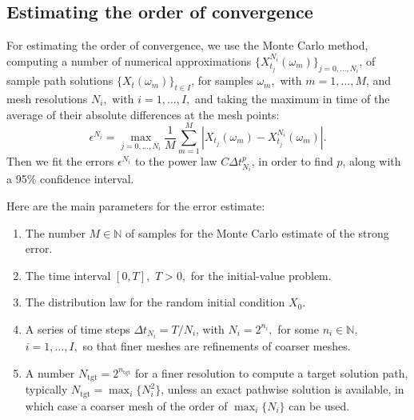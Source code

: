 \documentclass[reqno,12pt]{amsart}
\theoremstyle{plain} %
\theoremstyle{definition} %
\begin{document}
\subsection{Estimating the order of convergence}
\label{secconvergence}

For estimating the order of convergence, we use the Monte Carlo method, computing a number of numerical approximations $\{X_{t_j}^{N_i}(\omega_m)\}_{j=0, \ldots, N_i}$, of sample path solutions $\{X_t(\omega_m)\}_{t\in I}$, for samples $\omega_m,$ with $m = 1, \ldots, M$, and mesh resolutions $N_i,$ with $i=1, \ldots, I,$ and taking the maximum in time of the average of their absolute differences at the mesh points:
\begin{equation}
    \epsilon^{N_i} = \max_{j=0, \ldots, N_i} \frac{1}{M}\sum_{m=1}^M \left|X_{t_j}(\omega_m) - X_{t_j}^{N_i}(\omega_m)\right|.
\end{equation}
Then we fit the errors $\epsilon^{N_i}$ to the power law $C\Delta t_{N_i}^p$, in order to find $p$, along with a 95\% confidence interval.

Here are the main parameters for the error estimate:
\begin{enumerate}
    \item The number $M\in\mathbb{N}$ of samples for the Monte Carlo estimate of the strong error.
    \item The time interval $[0, T], $ $T > 0,$ for the initial-value problem.
    \item The distribution law for the random initial condition $X_0$.
    \item A series of time steps $\Delta t_{N_i} = T/N_i$, with $N_i=2^{n_i},$ for some $n_i\in\mathbb{N},$ $i=1, \ldots, I,$ so that finer meshes are refinements of coarser meshes.
    \item A number $N_{\mathrm{tgt}}=2^{n_\mathrm{tgt}}$ for a finer resolution to compute a target solution path, typically $N_{\mathrm{tgt}} = \max_i\{N_i^2\}$, unless an exact pathwise solution is available, in which case a coarser mesh of the order of $\max_i\{N_i\}$ can be used.
\end{enumerate}
\end{document}
